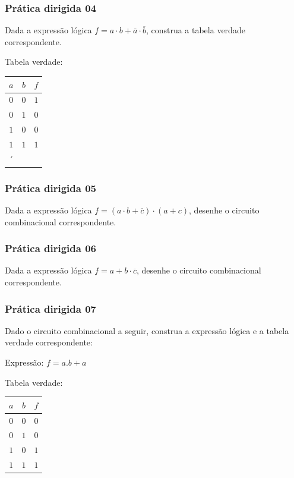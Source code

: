 \begin{frame}
	\frametitle{Prática dirigida 04}
	\par Dada a expressão lógica \( f = a \cdot b + \overline{a} \cdot \overline{b} \), construa a tabela verdade correspondente. %
	\pause
	\par Tabela verdade: \\
	\begin{tabular}{cc|c}
		$a$&$b$&$f$\\
		\hline
		$0$&$0$&$1$\\
		$0$&$1$&$0$\\
		$1$&$0$&$0$\\
		$1$&$1$&$1$\\
´	\end{tabular}
\end{frame}

\begin{frame}
	\frametitle{Prática dirigida 05}
	\par Dada a expressão lógica \( f = (a \cdot b + \overline{c}) \cdot (a + c) \), desenhe o circuito combinacional correspondente. %
	\pause
	\begin{figure}
		\centering
		
		\label{fig:exe12}
	\end{figure}
\end{frame}

\begin{frame}
	\frametitle{Prática dirigida 06}
	\par Dada a expressão lógica \( f = a + b \cdot \overline{c} \), desenhe o circuito combinacional correspondente. %
	\pause
	\begin{figure}
		\centering
		
		\label{fig:exe13}
	\end{figure}
\end{frame}

\begin{frame}
	\frametitle{Prática dirigida 07}
	\par Dado o circuito combinacional a seguir, construa a expressão lógica e a tabela verdade correspondente:
	\begin{figure}
		\centering
		
		\label{fig:exe08}
	\end{figure}
	\pause
	\par Expressão: $f=a.b+a$
	\par Tabela verdade:\\
	\begin{tabular}{cc|c}
		$a$&$b$&$f$\\
		\hline
		$0$&$0$&$0$\\
		$0$&$1$&$0$\\
		$1$&$0$&$1$\\
		$1$&$1$&$1$\\
	\end{tabular}
\end{frame}
